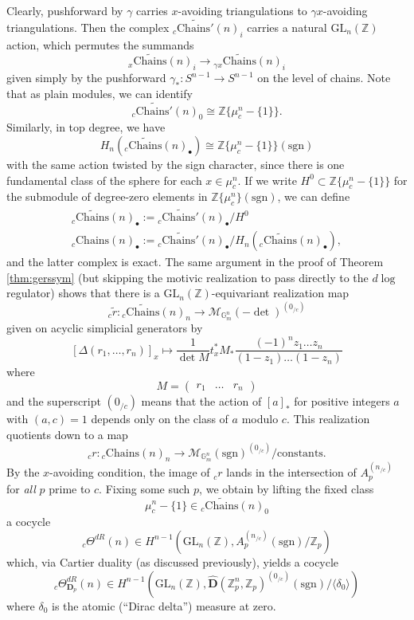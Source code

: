 \documentclass[10pt]{amsart}
\theoremstyle{definition}
\newcommand{\Z}{\mathbb{Z}}
\newcommand{\D}{\mathbf{D}}
\newcommand{\sgn}{\mathrm{sgn}}
\newcommand{\Chains}{\mathrm{Chains}}
\newcommand{\G}{\mathbb{G}}
\newcommand{\GL}{\mathrm{GL}}
\numberwithin{equation}{section}
\begin{document}
    Clearly, pushforward by $\gamma$ carries $x$-avoiding triangulations to $\gamma x$-avoiding triangulations. Then the complex ${}_c\widetilde{\Chains'}(n)_i$ carries a natural $\GL_n(\Z)$ action, which permutes the summands
    \[
        {}_x\widetilde{\Chains}(n)_i \to {}_{\gamma x}\widetilde{\Chains}(n)_i
    \]
    given simply by the pushforward $\gamma_*:S^{n-1}\to S^{n-1}$ on the level of chains. Note that as plain modules, we can identify
    \[
         {}_c\widetilde{\Chains'}(n)_0 \cong \Z \{\mu_{c}^n - \{1\}\}.
    \]
    Similarly, in top degree, we have
    \[
        H_{n}({}_c\widetilde{\Chains}(n)_\bullet) \cong \Z \{\mu_{c}^n-\{1\}\}(\mathrm{sgn})
    \]
    with the same action twisted by the sign character, since there is one fundamental class of the sphere for each $x\in \mu_{c}^n$. If we write $H^0\subset \Z \{\mu_{c}^n-\{1\}\}$ for the submodule of degree-zero elements in $\Z \{\mu_{c}^n\}(\mathrm{sgn})$, we can define
    \begin{align}
        {}_c\widetilde{\Chains}(n)_\bullet := {}_c\widetilde{\Chains'}(n)_\bullet/H^0 \\
        {}_c\Chains(n)_\bullet :={}_c\widetilde{\Chains'}(n)_\bullet/H_{n}({}_c\widetilde{\Chains}(n)_\bullet),
    \end{align}
    and the latter complex is exact. The same argument in the proof of Theorem \ref{thm:gerssym} (but skipping the motivic realization to pass directly to the $d\log$ regulator) shows that there is a $\GL_n(\Z)$-equivariant realization map 
    \[
    {}_c\tilde{r}: {}_c\widetilde{\Chains}(n)_n \to \mathcal{M}_{\G_m^n}(-\det)^{(0_{/c})}
    \]
    given on acyclic simplicial generators by
    \begin{equation} \label{eq:stabilizedsum}
        [\Delta(r_1,\ldots, r_n)]_x \mapsto \frac{1}{\det M}t_x^*M_* \frac{(-1)^nz_1\ldots z_n}{(1-z_1)\ldots (1-z_n)}
    \end{equation}
    where 
    \[
        M= \begin{pmatrix} r_1& \ldots & r_n\end{pmatrix}
    \]
    and the superscript $(0_{/c})$ means that the action of $[a]_*$ for positive integers $a$ with $(a,c)=1$ depends only on the class of $a$ modulo $c$. This realization quotients down to a map 
    \[
        {}_cr: {}_c\Chains(n)_n \to \mathcal{M}_{\G_m^n}(\sgn)^{(0_{/c})}/\mathrm{constants}.
    \]
    By the $x$-avoiding condition, the image of ${}_cr$ lands in the intersection of $A_p^{(n_{/c})}$ for \emph{all} $p$ prime to $c$. Fixing some such $p$, we obtain by lifting the fixed class
    \[
    \mu_c^n - \{1\} \in {}_c\widetilde{\Chains}(n)_0
    \]
    a cocycle
    \[
    {}_c\Theta^{dR}(n)\in H^{n-1}(\GL_n(\Z), A_p^{(n_{/c})}(\sgn)/\Z_p)
    \]
    which, via Cartier duality (as discussed previously), yields a cocycle
    \[
    {}_c\Theta^{dR}_{\D_p}(n)\in H^{n-1}(\GL_n(\Z), 
    \hat{\D}(\Z_p^n, \Z_p)^{(0_{/c})}(\sgn)/\langle \delta_0\rangle)
    \]
    where $\delta_0$ is the atomic (``Dirac delta'') measure at zero. 
\end{document}
